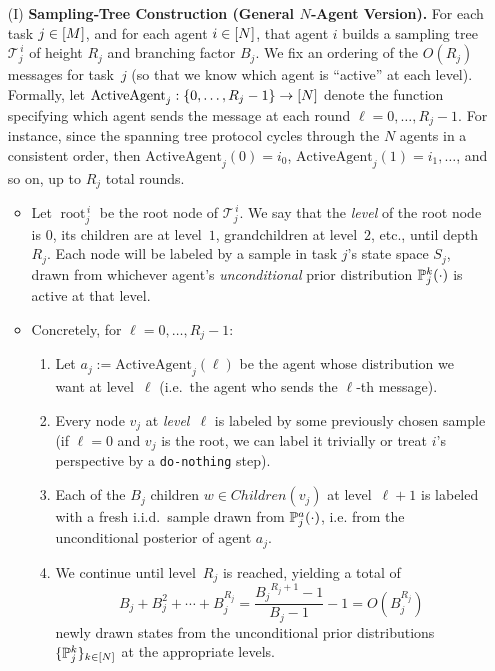 \begin{enumerate}
\item[(I)] \textbf{Sampling‐Tree Construction (General $N$‐Agent Version).}
For each task $j\in[M]$, and for each agent $i\in [N]$, that agent $i$ builds a sampling tree $\mathcal{T}^{\,i}_{j}$ of height $R_j$ and branching factor $B_j$. 
We fix an ordering of the $O\left(R_j\right)$ messages for task~$j$ (so that we know which agent is ``active'' at each level).
Formally, let $\mathrm{ActiveAgent}_j:\{0,\dots,R_j-1\}\to [N]$ denote the function specifying which agent sends the message at each round $\ell=0,\dots,R_j-1$. 
For instance, since the spanning tree protocol cycles through the $N$ agents in a consistent order, then $\mathrm{ActiveAgent}_j(0)=i_0$, $\mathrm{ActiveAgent}_j(1)=i_1,\dots$, and so on, up to $R_j$ total rounds.

\begin{itemize}
\item 
  Let $\operatorname{root}^{\,i}_{j}$ be the root node of $\mathcal{T}^{\,i}_{j}$. 
  We say that the \emph{level} of the root node is $0$, its children are at level~$1$, grandchildren at level~$2$, etc., until depth $R_j$.  
  Each node will be labeled by a sample in task $j$'s state space $S_j$, drawn from whichever agent's \emph{unconditional} prior distribution $\mathbb{P}^k_j(\cdot)$ is active at that level.

\item 
  Concretely, for $\ell=0,\dots,R_j-1$:
  \begin{enumerate}
  \item 
    Let $a_j := \mathrm{ActiveAgent}_j(\ell)$ 
    be the agent whose distribution we want at level~$\ell$ (i.e.\ the agent who sends the $\ell$‐th message). 
    \item 
    Every node $v_j$ at \emph{level~$\ell$} is labeled by some previously chosen sample (if $\ell=0$ and $v_j$ is the root, we can label it trivially or treat $i$'s perspective by a \texttt{do‐nothing} step).  
    \item 
    Each of the $B_j$ children $w\in Children(v_j)$ at level~$\ell+1$ 
    is labeled with a fresh i.i.d.\ sample drawn from $\mathbb{P}^a_j(\cdot)$, i.e. from the unconditional posterior of agent $a_j$. 
    \item 
    We continue until level~$R_j$ is reached, yielding a total of 
    \begin{equation}\label{eq:sampling-tree-draws}
      B_j + B_j^2 + \cdots + B_j^{R_j} = \frac{{B_j}^{R_j+1}-1}{B_j-1}-1 = O\left(B_j^{R_j}\right)
    \end{equation}
    newly drawn states from the unconditional prior distributions $\{\mathbb{P}^k_j\}_{k\in [N]}$ at the appropriate levels.
  \end{enumerate}
\end{itemize}


\end{enumerate}
